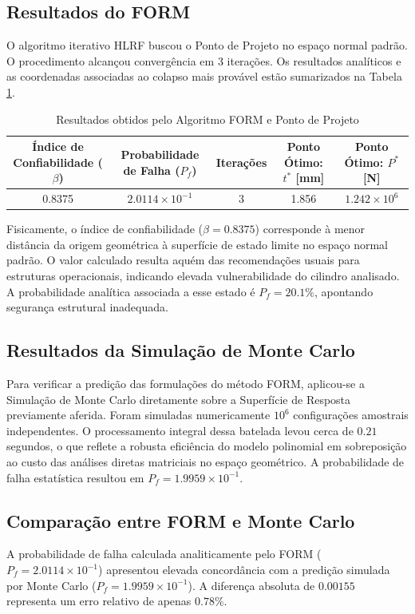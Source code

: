 \documentclass[12pt,a4paper]{article}
\begin{document}
\subsection{Resultados do FORM}
O algoritmo iterativo HLRF buscou o Ponto de Projeto no espaço normal padrão. O procedimento alcançou convergência em 3 iterações. Os resultados analíticos e as coordenadas associadas ao colapso mais provável estão sumarizados na Tabela \ref{tab:form}.

\begin{table}[ht]
\centering
\caption{Resultados obtidos pelo Algoritmo FORM e Ponto de Projeto}
\label{tab:form}
\begin{tabular}{ccccc}
\hline
Índice de Confiabilidade ($\beta$) & Probabilidade de Falha ($P_f$) & Iterações & Ponto Ótimo: $t^*$ [mm] & Ponto Ótimo: $P^*$ [N] \\
\hline
0.8375 & $2.0114 \times 10^{-1}$ & 3 & 1.856 & $1.242 \times 10^6$ \\
\hline
\end{tabular}
\end{table}

Fisicamente, o índice de confiabilidade ($\beta = 0.8375$) corresponde à menor distância da origem geométrica à superfície de estado limite no espaço normal padrão. O valor calculado resulta aquém das recomendações usuais para estruturas operacionais, indicando elevada vulnerabilidade do cilindro analisado. A probabilidade analítica associada a esse estado é $P_f = 20.1\%$, apontando segurança estrutural inadequada.

\subsection{Resultados da Simulação de Monte Carlo}
Para verificar a predição das formulações do método FORM, aplicou-se a Simulação de Monte Carlo diretamente sobre a Superfície de Resposta previamente aferida. Foram simuladas numericamente $10^6$ configurações amostrais independentes. O processamento integral dessa batelada levou cerca de $0.21$ segundos, o que reflete a robusta eficiência do modelo polinomial em sobreposição ao custo das análises diretas matriciais no espaço geométrico. A probabilidade de falha estatística resultou em $P_f = 1.9959 \times 10^{-1}$. 

\subsection{Comparação entre FORM e Monte Carlo}
A probabilidade de falha calculada analiticamente pelo FORM ($P_f = 2.0114 \times 10^{-1}$) apresentou elevada concordância com a predição simulada por Monte Carlo ($P_f = 1.9959 \times 10^{-1}$). A diferença absoluta de $0.00155$ representa um erro relativo de apenas $0.78\%$.
\end{document}
